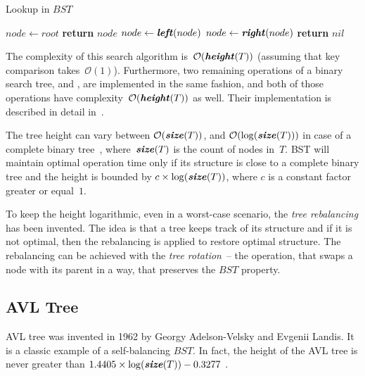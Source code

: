 \begin{algorithm}[t]
\caption{Lookup in $BST$}\label{alg:bst_find}
\begin{algorithmic}[1]
    \State $node\gets root$
      \State \textbf{return} $node$
      \State $node \gets \textbf{\textit{left}}(node)$
    \Else {}
      \State $node \gets \textbf{\textit{right}}(node)$
    \EndIf
    \EndWhile
    \State \textbf{return} $nil$
  \EndProcedure
\end{algorithmic}
\end{algorithm}

The complexity of this search algorithm is~$\mathcal{O}(\textbf{\textit{height}}(T))$ (assuming that key comparison takes~$\mathcal{O}(1)$). Furthermore, two remaining operations of a binary search tree, \insertop and \removeop, are implemented in the same fashion, and both of those operations have complexity~$\mathcal{O}(\textbf{\textit{height}}(T))$ as well. Their implementation is described in detail in~\cite[p.~327]{sedgewick}.

The tree height can vary between $\mathcal{O}(\textbf{\textit{size}}(T))$,
 and $\mathcal{O}(\log(\textbf{\textit{size}}(T)))$ in case of a complete binary tree~\cite{complete_bt}, where~$\textbf{\textit{size}}(T)$ is the count of nodes in~$T$. BST will maintain optimal operation time only if its structure is close to a complete binary tree and the height is bounded by $c \times \log(\textbf{\textit{size}}(T))$, where $c$ is a constant factor greater or equal~$1$.

 To keep the height logarithmic, even in a worst-case scenario, the \emph{tree rebalancing} has been invented. The idea is that a tree keeps track of its structure and if it is not optimal, then the rebalancing is applied to restore optimal structure. The rebalancing can be achieved with the \emph{tree rotation}\cite[p.~435]{sedgewick}~-- the operation, that swaps a node with its parent in a way, that preserves the $BST$ property.


\subsection{AVL Tree}

AVL tree was invented in 1962 by Georgy Adelson-Velsky and Evgenii Landis\cite{avl_tree}. It is a classic example of a self-balancing $BST$. In fact, the height of the AVL tree is never greater than $1.4405\times \log(\textbf{\textit{size}}(T)) - 0.3277$ \cite[p.~460]{knuth3}.

